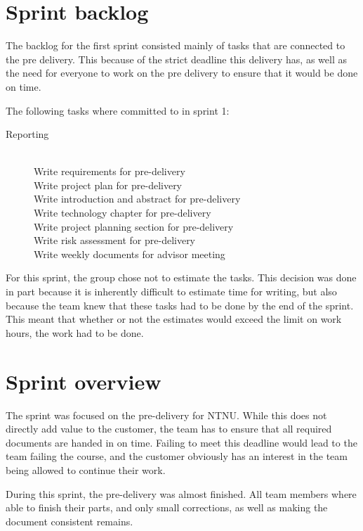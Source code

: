 \documentclass[11pt,a4paper,titlepage,oneside]{report}
\begin{document}
\section{Sprint backlog}
The backlog for the first sprint consisted mainly of tasks that are connected to the pre delivery. This because of the strict deadline this delivery has, as well as the need for everyone to work on the pre delivery to ensure that it would be done on time.

The following tasks where committed to in sprint 1:

\begin{description}
	\item[Reporting] \hfill \\ 
	Write requirements for pre-delivery \hfill \\
	Write project plan for pre-delivery \hfill \\
	Write introduction and abstract for pre-delivery \hfill \\
	Write technology chapter for pre-delivery \hfill \\
	Write project planning section for pre-delivery \hfill \\
	Write risk assessment for pre-delivery \hfill \\
	Write weekly documents for advisor meeting
\end{description}

For this sprint, the group chose not to estimate the tasks. This decision was done in part because it is inherently difficult to estimate time for writing, but also because the team knew that these tasks had to be done by the end of the sprint. This meant that whether or not the estimates would exceed the limit on work hours, the work had to be done.

\section{Sprint overview}
The sprint was focused on the pre-delivery for \gls{NTNU}. While this does not directly add value to the customer, the team has to ensure that all required documents are handed in on time. Failing to meet this deadline would lead to the team failing the course, and the customer obviously has an interest in the team being allowed to continue their work. 

During this sprint, the pre-delivery was almost finished. All team members where able to finish their parts, and only small corrections, as well as making the document consistent remains. 
\end{document}
